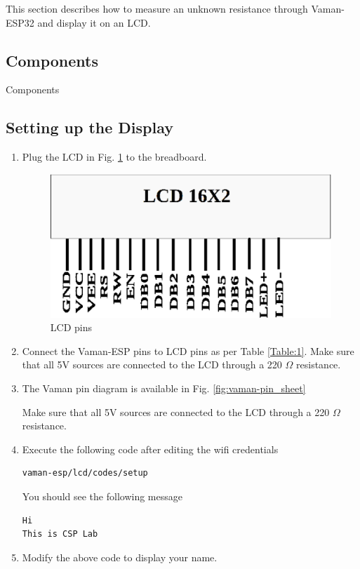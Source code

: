 This section describes how to measure an unknown resistance through Vaman-ESP32 
and display it on an LCD.
\subsection{Components}

\begin{table}[!ht]
\centering

\caption{Components}
\label{table:components}
\end{table}

\subsection{Setting up the Display}
\begin{enumerate}[label=\thesection.\arabic*.,ref=\thesection.\theenumi]

\item
Plug the LCD in Fig. \ref{fig:lcd} to the breadboard.

\begin{figure}
\centering
\includegraphics[width=\columnwidth]{vaman-esp32/lcd/figs/lcd.eps}
\caption{LCD pins}
\label{fig:lcd}
\end{figure}
\item
Connect the Vaman-ESP pins to LCD pins as per Table \ref{Table:1}. Make sure that all 5V sources are connected to the LCD through a 220 $\Omega$ resistance.
\item
The Vaman pin diagram is available in Fig. \ref{fig:vaman-pin_sheet}
\begin{table}[!ht]
\centering

\caption{Make sure that all 5V sources are connected to the LCD through a 220 $\Omega$ resistance.}
\label{Table:1}
\end{table}

\item Execute the following code after editing the wifi credentials
\begin{lstlisting}
vaman-esp/lcd/codes/setup
\end{lstlisting}
You should see the following message
\begin{lstlisting}
Hi
This is CSP Lab
\end{lstlisting}
\item Modify the above code to display your name.
\end{enumerate}
